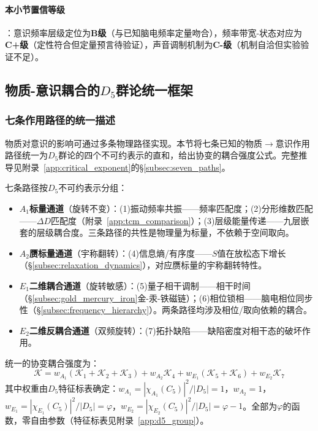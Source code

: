 \documentclass[12pt,a4paper,twocolumn]{article}
\renewcommand{\phi}{\varphi}
\begin{document}
\paragraph{本小节置信等级}：意识频率层级定位为\textbf{B级}（与已知脑电频率定量吻合），频率带宽-状态对应为\textbf{C+级}（定性符合但定量预言待验证），声音调制机制为\textbf{C-级}（机制自洽但实验验证不足）。

\subsection{物质-意识耦合的$D_5$群论统一框架}
\label{subsec:d5_seven_paths}

\subsubsection{七条作用路径的统一描述}
物质对意识的影响可通过多条物理路径实现。本节将七条已知的物质$\to$意识作用路径统一为$D_5$群论的四个不可约表示的直和，给出协变的耦合强度公式。完整推导见附录~\ref{app:critical_exponent}的\S\ref{subsec:seven_paths}。

七条路径按$D_5$不可约表示分组：
\begin{itemize}
\item \textbf{$A_1$标量通道}（旋转不变）：(1)振动频率共振——频率匹配度；(2)分形维数匹配——$\Delta D$匹配度（附录~\ref{app:tcm_comparison}）；(3)层级能量传递——九层嵌套的层级耦合度。三条路径的共性是物理量为标量，不依赖于空间取向。
\item \textbf{$A_2$赝标量通道}（宇称翻转）：(4)信息熵/有序度——$S$值在放松态下增长（\S\ref{subsec:relaxation_dynamics}），对应赝标量的宇称翻转特性。
\item \textbf{$E_1$二维耦合通道}（旋转敏感）：(5)量子相干调制——相干时间（\S\ref{subsec:gold_mercury_iron}金-汞-铁磁链）；(6)相位锁相——脑电相位同步性（\S\ref{subsec:frequency_hierarchy}）。两条路径均涉及相位/取向依赖的耦合。
\item \textbf{$E_2$二维反耦合通道}（双频旋转）：(7)拓扑缺陷——缺陷密度对相干态的破坏作用。
\end{itemize}

统一的协变耦合强度为：
\begin{equation}
\label{eq:d5_coupling}
\mathcal{K} = w_{A_1}(\mathcal{K}_1 + \mathcal{K}_2 + \mathcal{K}_3) + w_{A_2}\mathcal{K}_4 + w_{E_1}(\mathcal{K}_5 + \mathcal{K}_6) + w_{E_2}\mathcal{K}_7
\end{equation}
其中权重由$D_5$特征标表确定：$w_{A_1} = |\chi_{A_1}(C_5)|^2/|D_5| = 1$，$w_{A_2} = 1$，$w_{E_1} = |\chi_{E_1}(C_5)|^2/|D_5| = \phi$，$w_{E_2} = |\chi_{E_2}(C_5)|^2/|D_5| = \phi - 1$。全部为$\phi$的函数，零自由参数（特征标表见附录~\ref{app:d5_group}）。
\end{document}
